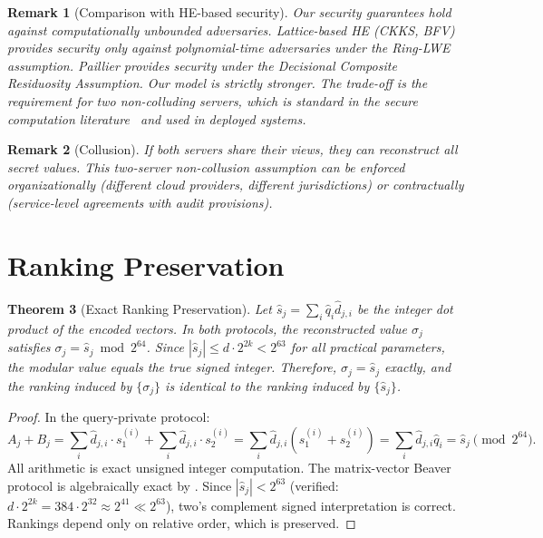 \documentclass[11pt]{article}
\newtheorem{theorem}{Theorem}[section]
\newtheorem{remark}[theorem]{Remark}
\begin{document}
\begin{remark}[Comparison with HE-based security]
Our security guarantees hold against computationally unbounded adversaries. Lattice-based HE (CKKS, BFV) provides security only against polynomial-time adversaries under the Ring-LWE assumption. Paillier provides security under the Decisional Composite Residuosity Assumption. Our model is strictly stronger. The trade-off is the requirement for two non-colluding servers, which is standard in the secure computation literature~\cite{demmler2015aby} and used in deployed systems.
\end{remark}

\begin{remark}[Collusion]
If both servers share their views, they can reconstruct all secret values. This two-server non-collusion assumption can be enforced organizationally (different cloud providers, different jurisdictions) or contractually (service-level agreements with audit provisions).
\end{remark}


\section{Ranking Preservation}
\label{sec:ranking}

\begin{theorem}[Exact Ranking Preservation]
\label{thm:ranking}
Let $\hat{s}_j = \sum_i \hat{q}_i \hat{d}_{j,i}$ be the integer dot product of the encoded vectors. In both protocols, the reconstructed value $\sigma_j$ satisfies $\sigma_j = \hat{s}_j \bmod 2^{64}$. Since $|\hat{s}_j| \leq d \cdot 2^{2k} < 2^{63}$ for all practical parameters, the modular value equals the true signed integer. Therefore, $\sigma_j = \hat{s}_j$ exactly, and the ranking induced by $\{\sigma_j\}$ is identical to the ranking induced by $\{\hat{s}_j\}$.
\end{theorem}

\begin{proof}
In the query-private protocol:
\[
A_j + B_j = \sum_i \hat{d}_{j,i} \cdot s_1^{(i)} + \sum_i \hat{d}_{j,i} \cdot s_2^{(i)} = \sum_i \hat{d}_{j,i} (s_1^{(i)} + s_2^{(i)}) = \sum_i \hat{d}_{j,i} \hat{q}_i = \hat{s}_j \pmod{2^{64}}.
\]
All arithmetic is exact unsigned integer computation. The matrix-vector Beaver protocol is algebraically exact by . Since $|\hat{s}_j| < 2^{63}$ (verified: $d \cdot 2^{2k} = 384 \cdot 2^{32} \approx 2^{41} \ll 2^{63}$), two's complement signed interpretation is correct. Rankings depend only on relative order, which is preserved.
\end{proof}
\end{document}
